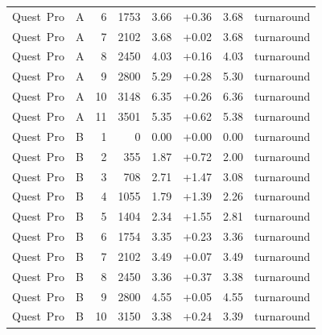 {\begin{longtable}{llrrrrrl}
Quest~Pro & A & 6 & 1753 & 3.66 & +0.36 & 3.68 & turnaround \\
Quest~Pro & A & 7 & 2102 & 3.68 & +0.02 & 3.68 & turnaround \\
Quest~Pro & A & 8 & 2450 & 4.03 & +0.16 & 4.03 & turnaround \\
Quest~Pro & A & 9 & 2800 & 5.29 & +0.28 & 5.30 & turnaround \\
Quest~Pro & A & 10 & 3148 & 6.35 & +0.26 & 6.36 & turnaround \\
Quest~Pro & A & 11 & 3501 & 5.35 & +0.62 & 5.38 & turnaround \\
\addlinespace
Quest~Pro & B & 1 & 0 & 0.00 & +0.00 & 0.00 & turnaround \\
Quest~Pro & B & 2 & 355 & 1.87 & +0.72 & 2.00 & turnaround \\
Quest~Pro & B & 3 & 708 & 2.71 & +1.47 & 3.08 & turnaround \\
Quest~Pro & B & 4 & 1055 & 1.79 & +1.39 & 2.26 & turnaround \\
Quest~Pro & B & 5 & 1404 & 2.34 & +1.55 & 2.81 & turnaround \\
Quest~Pro & B & 6 & 1754 & 3.35 & +0.23 & 3.36 & turnaround \\
Quest~Pro & B & 7 & 2102 & 3.49 & +0.07 & 3.49 & turnaround \\
Quest~Pro & B & 8 & 2450 & 3.36 & +0.37 & 3.38 & turnaround \\
Quest~Pro & B & 9 & 2800 & 4.55 & +0.05 & 4.55 & turnaround \\
Quest~Pro & B & 10 & 3150 & 3.38 & +0.24 & 3.39 & turnaround \\
\end{longtable}
}

